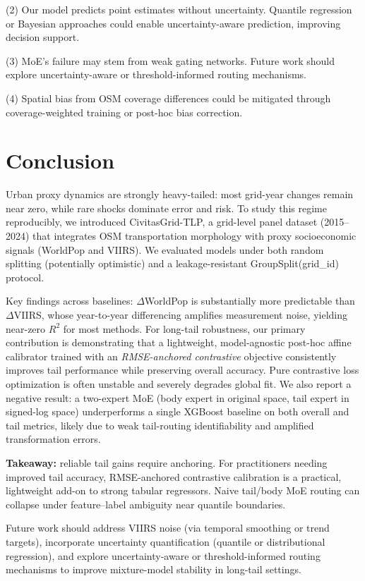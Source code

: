 \documentclass[pdflatex,sn-basic,Numbered]{sn-jnl}
\begin{document}
(2) Our model predicts point estimates without uncertainty. Quantile regression or Bayesian approaches could enable uncertainty-aware prediction, improving decision support.

(3) MoE's failure may stem from weak gating networks. Future work should explore uncertainty-aware or threshold-informed routing mechanisms.

(4) Spatial bias from OSM coverage differences could be mitigated through coverage-weighted training or post-hoc bias correction.

\section{Conclusion}

Urban proxy dynamics are strongly heavy-tailed: most grid-year changes remain near zero, while rare shocks dominate error and risk. To study this regime reproducibly, we introduced CivitasGrid-TLP, a grid-level panel dataset (2015–2024) that integrates OSM transportation morphology with proxy socioeconomic signals (WorldPop and VIIRS). We evaluated models under both random splitting (potentially optimistic) and a leakage-resistant GroupSplit(grid\_id) protocol.

Key findings across baselines: $\Delta$WorldPop is substantially more predictable than $\Delta$VIIRS, whose year-to-year differencing amplifies measurement noise, yielding near-zero $R^2$ for most methods. For long-tail robustness, our primary contribution is demonstrating that a lightweight, model-agnostic post-hoc affine calibrator trained with an \emph{RMSE-anchored contrastive} objective consistently improves tail performance while preserving overall accuracy. Pure contrastive loss optimization is often unstable and severely degrades global fit. We also report a negative result: a two-expert MoE (body expert in original space, tail expert in signed-log space) underperforms a single XGBoost baseline on both overall and tail metrics, likely due to weak tail-routing identifiability and amplified transformation errors.

\textbf{Takeaway:} reliable tail gains require anchoring. For practitioners needing improved tail accuracy, RMSE-anchored contrastive calibration is a practical, lightweight add-on to strong tabular regressors. Naive tail/body MoE routing can collapse under feature–label ambiguity near quantile boundaries.

Future work should address VIIRS noise (via temporal smoothing or trend targets), incorporate uncertainty quantification (quantile or distributional regression), and explore uncertainty-aware or threshold-informed routing mechanisms to improve mixture-model stability in long-tail settings.
\end{document}

